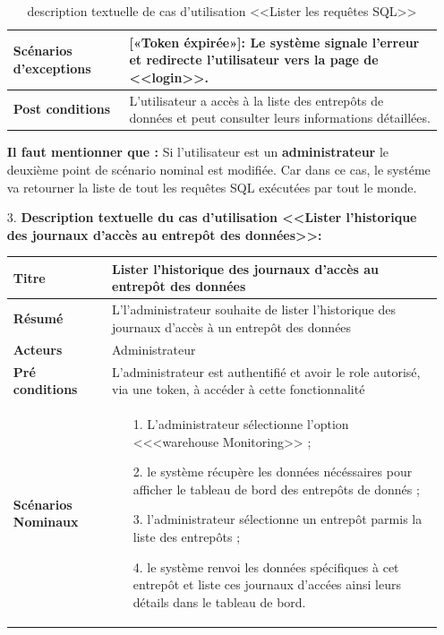 \begin{enumerate}
\begin{table}[H]
\begin{tabular}{|p{3.5cm}|p{12cm}|}
                \hline  \textbf{Scénarios d'exceptions} & 
                  [«Token éxpirée»]: Le système signale l'erreur et redirecte l'utilisateur vers la page de <<login>>.\\
                \hline \textbf{Post conditions} & L'utilisateur a accès à la liste des entrepôts de données et peut consulter leurs informations détaillées.\\
                \hline 
            \end{tabular}
        \caption{description textuelle de cas d'utilisation <<Lister les requêtes SQL>>}
        \end{table}
        \par \textbf{Il faut mentionner que : } Si l'utilisateur est un \textbf{administrateur} le deuxième point de scénario nominal est modifiée. 
        Car dans ce cas, le systéme va retourner la liste de tout les requêtes SQL exécutées par tout le monde.
\newpage
\vspace{2cm}
        \item[3.] \textbf{Description textuelle du cas d'utilisation <<Lister l'historique des journaux d'accès au entrepôt des données>>:}
    \begin{table}[H]
        \centering
        \begin{tabular}{|p{3.5cm}|p{12cm}|}
            \hline \textbf{Titre} &  Lister l'historique des journaux d'accès au entrepôt des données\\
            \hline \textbf{Résumé} & L'l'administrateur souhaite de lister l'historique des journaux d'accès à un entrepôt des données \\
            \hline \textbf{Acteurs} & Administrateur \\
            \hline \textbf{Pré conditions }& L'administrateur est authentifié et avoir le role autorisé, via une token, à accéder à cette fonctionnalité\\
            \hline \textbf{Scénarios Nominaux} &
                \begin{enumerate}
                    \item [1.] L'administrateur sélectionne l'option <<<warehouse Monitoring>> ;
                    \item [2.] le système récupère les données nécéssaires pour afficher le tableau de bord des entrepôts de donnés  ;
                    \item [3.] l'administrateur sélectionne un entrepôt parmis la liste des entrepôts ;
                    \item [4.] le système renvoi les données spécifiques à cet entrepôt et liste ces journaux d'accées ainsi leurs détails dans le tableau de bord.      

\end{enumerate}
\end{tabular}
\end{table}
\end{enumerate}
